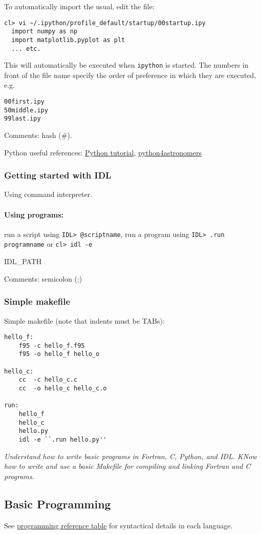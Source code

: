 \documentclass{article}
\newcommand{\test}[1]{%
    \begin{center}
        \colorbox{hl}{\parbox{0.9\textwidth}{\emph{#1}}}
    \end{center}}
\begin{document}
To automatically import the usual, edit the file:
\begin{verbatim}
cl> vi ~/.ipython/profile_default/startup/00startup.ipy
  import numpy as np
  import matplotlib.pyplot as plt
  ... etc.
\end{verbatim}
This will automatically be executed when \verb|ipython| is started.
The numbers in front of the file name specify the order of preference
in which they are executed, e.g.\
\begin{verbatim}
00first.ipy
50middle.ipy
99last.ipy
\end{verbatim}

Comments: hash (\#).

Python useful references: \href{http://www.python-course.eu/course.php}
{Python tutorial},
\href{https://python4astronomers.github.io}{python4astronomers}


\subsubsection{Getting started with IDL}
Using command interpreter.
\paragraph{Using programs:}
run a script using \verb|IDL> @scriptname|, run a program using
\verb|IDL> .run programname| or
\verb|cl> idl -e|

IDL\_PATH

Comments: semicolon (;)
\subsubsection{Simple makefile}
Simple makefile (note that indents must be TABs):

\begin{verbatim}
hello_f:
    f95 -c hello_f.f95
    f95 -o hello_f hello_o

hello_c:
    cc  -c hello_c.c
    cc  -o hello_c hello_c.o

run:
    hello_f
    hello_c
    hello.py
    idl -e ``.run hello.py''
\end{verbatim}

\test{Understand how to write basic programs in Fortran, C,
Python, and IDL. KNow how to write and use a basic Makefile for
compiling and linking Fortran and C programs.}

\subsection{Basic Programming}
See \href{http://astronomy.nmsu.edu/holtz/a575/programming.html}
{programming reference table} for syntactical details in each
language.
\end{document}
